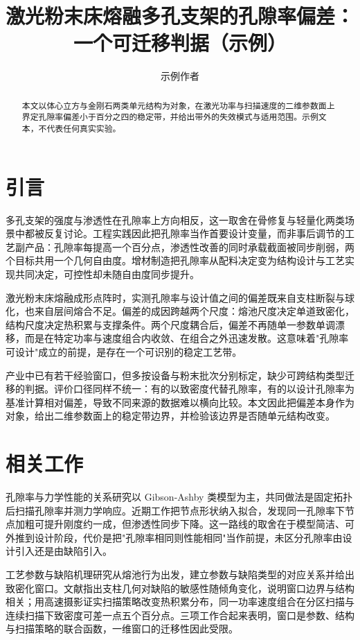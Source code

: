 \documentclass[11pt]{article}
\title{激光粉末床熔融多孔支架的孔隙率偏差：一个可迁移判据（示例）}
\author{示例作者}
\begin{document}
\maketitle

\begin{abstract}
本文以体心立方与金刚石两类单元结构为对象，在激光功率与扫描速度的二维参数面上界定孔隙率偏差小于百分之四的稳定带，并给出带外的失效模式与适用范围。示例文本，不代表任何真实实验。
\end{abstract}

\section{引言}
多孔支架的强度与渗透性在孔隙率上方向相反，这一取舍在骨修复与轻量化两类场景中都被反复讨论\cite{wang2019}。工程实践因此把孔隙率当作首要设计变量，而非事后调节的工艺副产品：孔隙率每提高一个百分点，渗透性改善的同时承载截面被同步削弱，两个目标共用一个几何自由度。增材制造把孔隙率从配料决定变为结构设计与工艺实现共同决定，可控性却未随自由度同步提升\cite{zhang2020}。

激光粉末床熔融成形点阵时，实测孔隙率与设计值之间的偏差既来自支柱断裂与球化，也来自层间熔合不足\cite{liu2022}。偏差的成因跨越两个尺度：熔池尺度决定单道致密化，结构尺度决定热积累与支撑条件。两个尺度耦合后，偏差不再随单一参数单调漂移，而是在特定功率与速度组合内收敛、在组合之外迅速发散\cite{chen2021}。这意味着"孔隙率可设计"成立的前提，是存在一个可识别的稳定工艺带。

产业中已有若干经验窗口，但多按设备与粉末批次分别标定，缺少可跨结构类型迁移的判据\cite{sun2020}。评价口径同样不统一：有的以致密度代替孔隙率，有的以设计孔隙率为基准计算相对偏差，导致不同来源的数据难以横向比较\cite{park2021}。本文因此把偏差本身作为对象，给出二维参数面上的稳定带边界，并检验该边界是否随单元结构改变。

\section{相关工作}
孔隙率与力学性能的关系研究以 Gibson-Ashby 类模型为主，共同做法是固定拓扑后扫描孔隙率并测力学响应\cite{wang2019}。近期工作把节点形状纳入拟合，发现同一孔隙率下节点加粗可提升刚度约一成，但渗透性同步下降\cite{wu2023}。这一路线的取舍在于模型简洁、可外推到设计阶段，代价是把"孔隙率相同则性能相同"当作前提，未区分孔隙率由设计引入还是由缺陷引入。

工艺参数与缺陷机理研究从熔池行为出发，建立参数与缺陷类型的对应关系并给出致密化窗口\cite{chen2021}。文献\cite{zhang2020}指出支柱几何对缺陷的敏感性随倾角变化，说明窗口边界与结构相关；\cite{rossi2022}用高速摄影证实扫描策略改变热积累分布，同一功率速度组合在分区扫描与连续扫描下致密度可差一点五个百分点。三项工作合起来表明，窗口是参数、结构与扫描策略的联合函数，一维窗口的迁移性因此受限。
\end{document}
